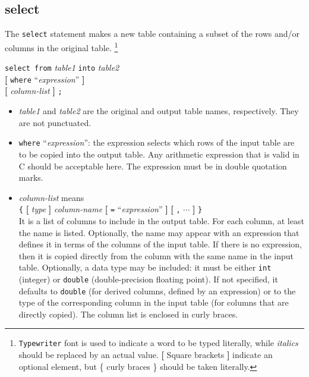 \documentclass[12pt]{article}
\begin{document}
\subsection{select}

The {\tt select} statement makes a new table containing a subset of the 
rows and/or columns in the original table.
\footnote{{\tt Typewriter} font is used to
indicate a word to be typed literally, while {\em italics} should be
replaced by an actual value.  {\bf[} Square brackets {\bf]} indicate an 
optional element, but \{ curly braces \} should be taken literally.}

\begin{flushleft}
{\tt select from} {\em table1} {\tt into} {\em table2} \\
\hspace{1cm} {\bf[} {\tt where} ``{\em expression}'' {\bf]} \\
\hspace{1cm} {\bf[} {\em column-list} {\bf]} {\tt ;}
\end{flushleft}

\begin{itemize}
\item {\em table1} and {\em table2} are the original and output table names,
  respectively.  They are not punctuated.
\item {\tt where} ``{\em expression}'': the expression selects which rows
  of the input table are to be copied into the output table.  Any arithmetic
  expression that is valid in C should be acceptable here.  The expression 
  must be in double quotation marks.
\item {\em column-list} means \\
{\tt\{} {\bf[} {\em type} {\bf]} {\em column-name} {\bf[} {\tt =}
  ``{\em expression}'' {\bf]} {\bf[} {\tt ,} $\cdots$ {\bf]} {\tt\}} \\

It is a list of columns to include in the output table.  For each column, at
least the name is listed.  Optionally, the name may appear with an expression 
that defines it in terms of the columns of the input table.   If there is no
expression, then it is copied directly from the column with the same name
in the input table.  Optionally, a data type may be included: it must
be either {\tt int} (integer) or {\tt double} (double-precision floating 
point).  If not specified, it defaults to {\tt double} (for derived columns,
defined by an expression) or to the type of the corresponding column in the 
input table (for columns that are directly copied).  The column list is
enclosed in curly braces.
\end{itemize}
\end{document}

